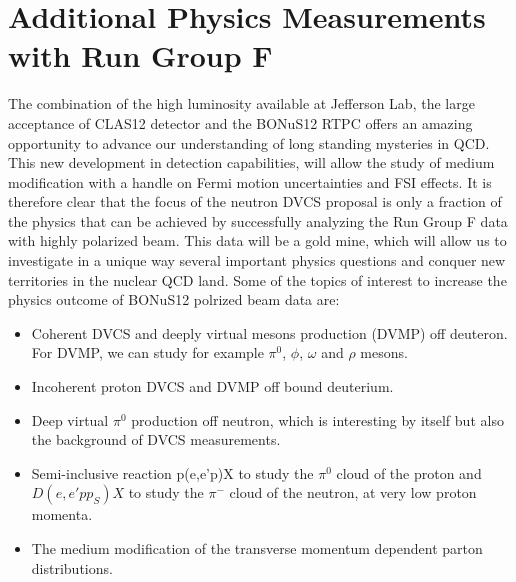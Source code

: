  \chapter{Additional Physics Measurements with Run Group F}
 \label{chap:additional}

The combination of the high luminosity available at Jefferson Lab, the large 
acceptance of CLAS12 detector and the BONuS12 RTPC offers an amazing 
opportunity to advance our understanding of long standing mysteries in QCD.  
This new development in detection capabilities, will allow the study of medium 
modification with a handle on Fermi motion uncertainties and FSI effects. It is 
therefore clear that the focus of the neutron DVCS proposal is only a fraction 
of the physics that can be achieved by successfully analyzing the Run Group F 
data with highly polarized beam. This data will be a gold mine, which will 
allow us to investigate in a unique way several important physics questions and 
conquer new territories in the nuclear QCD land. Some of the topics of interest 
to increase the physics outcome of BONuS12 polrized beam data are:

\begin{itemize}
\item Coherent DVCS and deeply virtual mesons production (DVMP) off deuteron.  
   For DVMP, we can study for example $\pi^0$, $\phi$, $\omega$ and $\rho$ 
      mesons.

\item Incoherent proton DVCS and DVMP off bound deuterium.

\item Deep virtual $\pi^0$ production off neutron, which is interesting by 
   itself but also the background of DVCS measurements.
\item Semi-inclusive reaction p(e,e'p)X to study the $\pi^0$ cloud of the 
   proton and $D(e, e' pp_S)X$ to study the $\pi^-$ cloud of the neutron, at 
      very low proton momenta.
\item The medium modification of the transverse momentum dependent parton 
   distributions.
\end{itemize}

